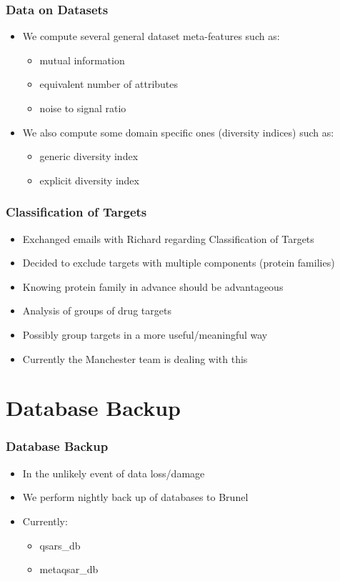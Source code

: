 \documentclass[compress]{beamer}
\begin{document}
\begin{frame}
\frametitle{Data on Datasets} 
\begin{itemize}%
  \item We compute several general dataset meta-features such as:
  \begin{itemize}
  \item mutual information
  \item equivalent number of attributes
  \item noise to signal ratio
  \end{itemize}
  \item We also compute some domain specific ones (diversity indices) such as:
  \begin{itemize}
  \item generic diversity index
  \item explicit diversity index
  \end{itemize}
\end{itemize}
\end{frame}

\begin{frame}
\frametitle{Classification of Targets} 
\begin{itemize}%
  \item Exchanged emails with Richard regarding Classification of Targets
  \item Decided to exclude targets with multiple components (protein families)
  \item Knowing protein family in advance should be advantageous
  \item Analysis of groups of drug targets
  \item Possibly group targets in a more useful/meaningful way  
  \item Currently the Manchester team is dealing with this
\end{itemize}
\end{frame}
 



\section{Database Backup}
\begin{frame}
\frametitle{Database Backup} 
\begin{itemize}%
 \item In the unlikely event of data loss/damage
 \item We perform nightly back up of databases to Brunel
 \item Currently:
    \begin{itemize}%
       \item qsars\_db
       \item metaqsar\_db
    \end{itemize}
\end{itemize}
\end{frame}
\end{document}
